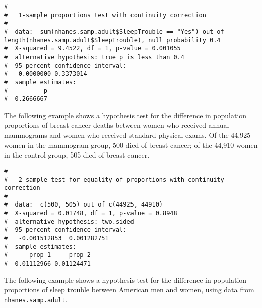\documentclass[letterpaper,12pt,twoside,]{pinp}
\begin{document}
\begin{ShadedResult}
\begin{verbatim}
#  
#   1-sample proportions test with continuity correction
#  
#  data:  sum(nhanes.samp.adult$SleepTrouble == "Yes") out of length(nhanes.samp.adult$SleepTrouble), null probability 0.4
#  X-squared = 9.4522, df = 1, p-value = 0.001055
#  alternative hypothesis: true p is less than 0.4
#  95 percent confidence interval:
#   0.0000000 0.3373014
#  sample estimates:
#          p 
#  0.2666667
\end{verbatim}
\end{ShadedResult}

The following example shows a hypothesis test for the difference in
population proportions of breast cancer deaths between women who
received annual mammograms and women who received standard physical
exams. Of the 44,925 women in the mammogram group, 500 died of breast
cancer; of the 44,910 women in the control group, 505 died of breast
cancer.

\begin{Shaded}
\begin{Highlighting}[]
\NormalTok{(} \NormalTok{(}\NormalTok{, }\NormalTok{), } \NormalTok{(}\NormalTok{, }\NormalTok{), } \NormalTok{, }
           \NormalTok{)}
\end{Highlighting}
\end{Shaded}

\begin{ShadedResult}
\begin{verbatim}
#  
#   2-sample test for equality of proportions with continuity correction
#  
#  data:  c(500, 505) out of c(44925, 44910)
#  X-squared = 0.01748, df = 1, p-value = 0.8948
#  alternative hypothesis: two.sided
#  95 percent confidence interval:
#   -0.001512853  0.001282751
#  sample estimates:
#      prop 1     prop 2 
#  0.01112966 0.01124471
\end{verbatim}
\end{ShadedResult}

The following example shows a hypothesis test for the difference in
population proportions of sleep trouble between American men and women,
using data from \texttt{nhanes.samp.adult}.
\end{document}
